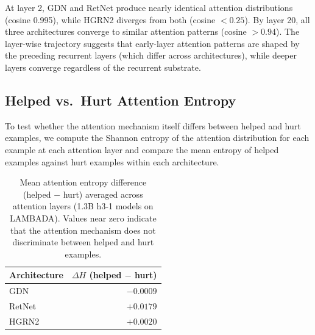 \begin{table}[ht]
\centering
\caption{Cosine similarity between mean attention weight distributions of architecture pairs at selected layers (1.3B h3-1 models on LAMBADA).}
\label{tab:attn_cosine}
\end{table}

At layer 2, GDN and RetNet produce nearly identical attention distributions (cosine 0.995), while HGRN2 diverges from both (cosine $< 0.25$). By layer 20, all three architectures converge to similar attention patterns (cosine $> 0.94$). The layer-wise trajectory suggests that early-layer attention patterns are shaped by the preceding recurrent layers (which differ across architectures), while deeper layers converge regardless of the recurrent substrate.

\subsection{Helped vs.\ Hurt Attention Entropy}

To test whether the attention mechanism itself differs between helped and hurt examples, we compute the Shannon entropy of the attention distribution for each example at each attention layer and compare the mean entropy of helped examples against hurt examples within each architecture.

\begin{table}[ht]
\centering
\caption{Mean attention entropy difference (helped $-$ hurt) averaged across attention layers (1.3B h3-1 models on LAMBADA). Values near zero indicate that the attention mechanism does not discriminate between helped and hurt examples.}
\label{tab:attn_entropy}
\begin{tabular}{lr}
\toprule
Architecture & $\Delta H$ (helped $-$ hurt) \\
\midrule
GDN & $-0.0009$ \\
RetNet & $+0.0179$ \\
HGRN2 & $+0.0020$ \\
\bottomrule
\end{tabular}
\end{table}

